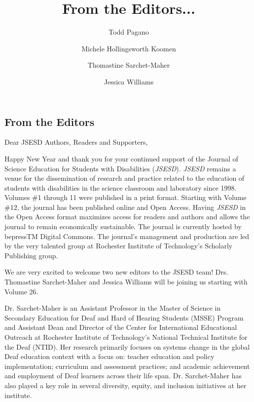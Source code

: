 \documentclass[11pt]{sig-alternate}
\begin{document}
\title{From the Editors...}

\author[1]{\large \color{blue} Todd Pagano}
\author[2]{\large \color{blue} Michele Hollingsworth Koomen}
\author[1]{\large \color{blue} Thomastine Sarchet-Maher}
\author[1]{\large \color{blue} Jessica Williams}



\toappear{}
\begin{large}
\maketitle

\section*{From the Editors}
Dear JSESD Authors, Readers and Supporters,

Happy New Year and thank you for your continued support of the Journal of Science Education for Students with Disabilities (\textit{JSESD}). \textit{JSESD} remains a venue for the dissemination of research and practice related to the education of students with disabilities in the science classroom and laboratory since 1998. Volumes \#1 through 11 were published in a print format. Starting with Volume \#12, the journal has been published online and Open Access. Having \textit{JSESD} in the Open Access format maximizes access for readers and authors and allows the journal to remain economically sustainable.  The journal is currently hosted by bepressTM Digital Commons.  The journal’s management and production are led by the very talented group at Rochester Institute of Technology’s Scholarly Publishing group.

We are very excited to welcome two new editors to the JSESD team!  Drs. Thomastine Sarchet-Maher and Jessica Williams will be joining us starting with Volume 26.

Dr. Sarchet-Maher is an Assistant Professor in the Master of Science in Secondary Education for Deaf and Hard of Hearing Students (MSSE) Program and Assistant Dean and Director of the Center for International Educational Outreach at Rochester Institute of Technology’s National Technical Institute for the Deaf (NTID). Her research primarily focuses on systems change in the global Deaf education context with a focus on: teacher education and policy implementation; curriculum and assessment practices; and academic achievement and employment of Deaf learners across their life span. Dr. Sarchet-Maher has also played a key role in several diversity, equity, and inclusion initiatives at her institute. 


\end{large}
\end{document}
